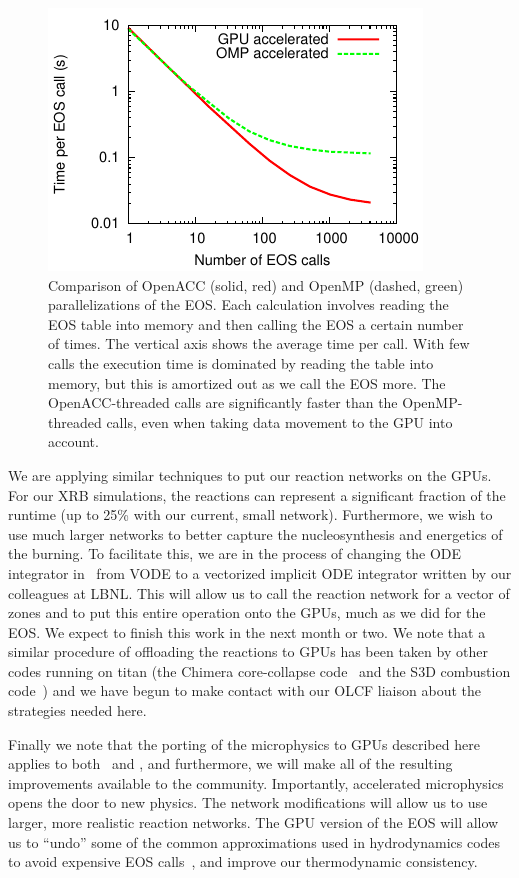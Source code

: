\documentclass[11pt,letterpaper,english]{article}
\begin{document}
\begin{figure}[t]
  \centering
  \includegraphics[width=0.5\linewidth]{eos_openacc.pdf}
  \begin{minipage}[b]{0.45\linewidth}
  \caption{Comparison of OpenACC (solid, red) and OpenMP (dashed,
    green) parallelizations of the EOS. Each calculation involves
    reading the EOS table into memory and then calling the EOS a
    certain number of times. The vertical axis shows the average time
    per call.  With few calls the execution time is dominated by
    reading the table into memory, but this is amortized out as we
    call the EOS more.  The OpenACC-threaded calls are significantly faster
    than the OpenMP-threaded calls, even when taking data movement to
    the GPU into account.\label{fig-eos-openacc}}
   \end{minipage}
\end{figure}

We are applying similar techniques to put our reaction networks on the
GPUs.  For our XRB simulations, the reactions can represent a
significant fraction of the runtime (up to 25\% with our current,
small network).  Furthermore, we wish to use much larger networks to
better capture the nucleosynthesis and energetics of the burning.  To
facilitate this, we are in the process of changing the ODE integrator
in \maestro\ from VODE to a vectorized implicit ODE integrator written
by our colleagues at LBNL.  This will allow us to call the reaction
network for a vector of zones and to put this entire operation onto
the GPUs, much as we did for the EOS.  We expect to finish this work
in the next month or two.  We note that a similar procedure of
offloading the reactions to GPUs has been taken by other codes running
on titan (the Chimera core-collapse code~\cite{chimera-gpu} and the
S3D combustion code~\cite{s3d}) and we have begun to make contact with
our OLCF liaison about the strategies needed here.

Finally we note that the porting of the microphysics to GPUs described
here applies to both \maestro\ and \castro, and furthermore, we will
make all of the resulting improvements available to the community.
Importantly, accelerated microphysics opens the door to new physics.
The network modifications will allow us to use larger, more realistic
reaction networks.  The GPU version of the EOS will allow us to 
``undo'' some of the common approximations used in hydrodynamics 
codes to avoid expensive EOS calls~\cite{colellaglaz:1985}, and improve our thermodynamic
consistency.



\end{document}
